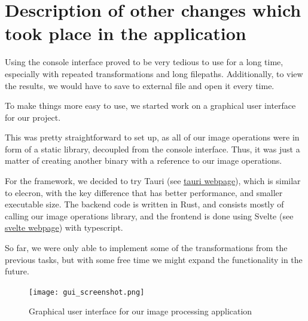 \documentclass[12pt]{article}
\begin{document}
\section{Description of other changes which took place in the application}

Using the console interface proved to be very tedious to use for a long time,
especially with repeated transformations and long filepaths.
Additionally, to view the results, we would have to save to external file and open it every time.

To make things more easy to use, we started work on a graphical user interface for our project.

This was pretty straightforward to set up, as all of our image operations were in form of a static library, 
decoupled from the console interface. 
Thus, it was just a matter of creating another binary with a reference to our image operations.

For the framework, we decided to try Tauri (see \href{https://tauri.app/about/intro}{tauri webpage}), which is similar to elecron, with the key difference that has better performance, and smaller executable size.
The backend code is written in Rust, and consists mostly of calling our image operations library,
and the frontend is done using Svelte (see \href{https://svelte.dev}{svelte webpage}) with typescript.

So far, we were only able to implement some of the transformations from the previous tasks,
but with some free time we might expand the functionality in the future.

\begin{figure}[H]\centering
    \texttt{[image: gui\_screenshot.png]}
    \caption{Graphical user interface for our image processing application}
\end{figure}
\end{document}
